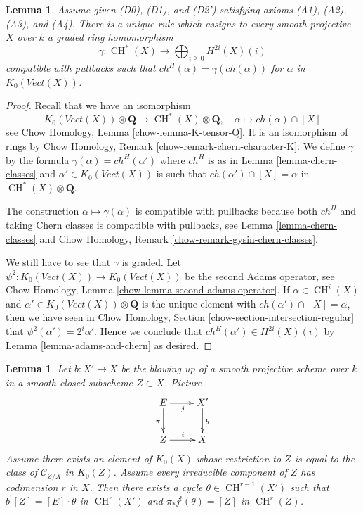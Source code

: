 \documentclass{stacks-project}
\theoremstyle{plain}
\newtheorem{lemma}[subsection]{Lemma}
\theoremstyle{definition}
\theoremstyle{remark}
\numberwithin{equation}{subsection}
\def\CH{\mathop{\mathrm{CH}}\nolimits}
\begin{document}
\begin{lemma}
\label{lemma-cycle-classes}
Assume given (D0), (D1), and (D2') satisfying axioms (A1), (A2), (A3), and (A4).
There is a unique rule which assigns to every smooth projective $X$ over $k$
a graded ring homomorphism
$$
\gamma : \CH^*(X) \longrightarrow \bigoplus\nolimits_{i \geq 0} H^{2i}(X)(i)
$$
compatible with pullbacks such that $ch^H(\alpha) = \gamma(ch(\alpha))$
for $\alpha$ in $K_0(\textit{Vect}(X))$.
\end{lemma}

\begin{proof}
Recall that we have an isomorphism
$$
K_0(\textit{Vect}(X)) \otimes \mathbf{Q}
\longrightarrow \CH^*(X) \otimes \mathbf{Q},\quad
\alpha \longmapsto ch(\alpha) \cap [X]
$$
see Chow Homology, Lemma \ref{chow-lemma-K-tensor-Q}. It is an isomorphism
of rings by Chow Homology, Remark \ref{chow-remark-chern-character-K}.
We define $\gamma$ by the formula $\gamma(\alpha) = ch^H(\alpha')$
where $ch^H$ is as in Lemma \ref{lemma-chern-classes} and
$\alpha' \in K_0(\textit{Vect}(X))$ is such that
$ch(\alpha') \cap [X] = \alpha$ in $\CH^*(X) \otimes \mathbf{Q}$.

\medskip\noindent
The construction $\alpha \mapsto \gamma(\alpha)$ is compatible
with pullbacks because both $ch^H$ and taking Chern classes
is compatible with pullbacks, see
Lemma \ref{lemma-chern-classes} and
Chow Homology, Remark \ref{chow-remark-gysin-chern-classes}.

\medskip\noindent
We still have to see that $\gamma$ is graded.
Let $\psi^2 : K_0(\textit{Vect}(X)) \to K_0(\textit{Vect}(X))$
be the second Adams operator, see Chow Homology,
Lemma \ref{chow-lemma-second-adams-operator}.
If $\alpha \in \CH^i(X)$ and
$\alpha' \in K_0(\textit{Vect}(X)) \otimes \mathbf{Q}$
is the unique element with $ch(\alpha') \cap [X] = \alpha$,
then we have seen in
Chow Homology, Section \ref{chow-section-intersection-regular}
that $\psi^2(\alpha') = 2^i \alpha'$.
Hence we conclude that $ch^H(\alpha') \in H^{2i}(X)(i)$
by Lemma \ref{lemma-adams-and-chern} as desired.
\end{proof}

\begin{lemma}
\label{lemma-divide-pullback-good-blowing-up}
Let $b : X' \to X$ be the blowing up of a smooth projective
scheme over $k$ in a smooth closed subscheme $Z \subset X$.
Picture
$$
\xymatrix{
E \ar[r]_j \ar[d]_\pi & X' \ar[d]^b \\
Z \ar[r]^i & X
}
$$
Assume there exists an element of $K_0(X)$ whose restriction to
$Z$ is equal to the class of $\mathcal{C}_{Z/X}$ in $K_0(Z)$.
Assume every irreducible component of $Z$ has codimension $r$ in $X$.
Then there exists a cycle $\theta \in \CH^{r - 1}(X')$
such that $b^![Z] = [E] \cdot \theta$ in $\CH^r(X')$ and
$\pi_*j^!(\theta) = [Z]$ in $\CH^r(Z)$.
\end{lemma}
\end{document}
